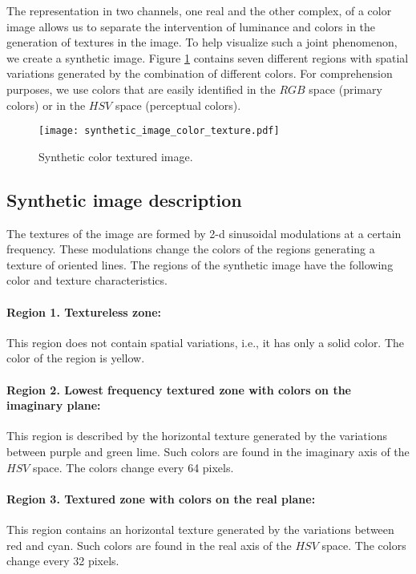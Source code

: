 The representation in two channels, one real and the other complex, of a color image allows us to separate the intervention of luminance and colors in the generation of textures in the image. To help visualize such a joint phenomenon, we create a synthetic image. Figure \ref{fig:synthetic_color_texture_image} contains seven different regions with spatial variations generated by the combination of different colors. For comprehension purposes, we use colors that are easily identified in the $RGB$ space (primary colors) or in the $HSV$ space (perceptual colors).

\begin{figure}
    \texttt{[image: synthetic\_image\_color\_texture.pdf]}
\caption{Synthetic color textured image.}\label{fig:synthetic_color_texture_image}
\end{figure}

\subsection{Synthetic image description}

The textures of the image are formed by 2-d sinusoidal modulations at a certain frequency. These modulations change the colors of the regions generating a texture of oriented lines. The regions of the synthetic image have the following color and texture characteristics.

\paragraph{Region 1. Textureless zone:}
This region does not contain spatial variations, i.e., it has only a solid color. The color of the region is yellow.

\paragraph{Region 2. Lowest frequency textured zone with colors on the imaginary plane:}
This region is described by the horizontal texture generated by the variations between purple and green lime. Such colors are found in the imaginary axis of the $HSV$ space. The colors change every 64 pixels.

\paragraph{Region 3. Textured zone with colors on the real plane:}
This region contains an horizontal texture generated by the variations between red and cyan. Such colors are found in the real axis of the $HSV$ space. The colors change every 32 pixels.

